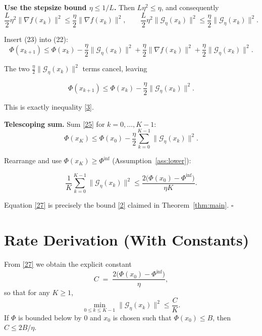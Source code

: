 \documentclass{article}
\begin{document}
\begin{enumerate}[label={[\textbf{Step \arabic*.}]},leftmargin=*,align=left]
\item \textbf{Use the stepsize bound $\eta\le 1/L$.} Then $L\eta^{2}\le\eta$, and consequently
\[
\frac{L}{2}\eta^{2}\|\nabla f(x_k)\|^{2}\le\frac{\eta}{2}\|\nabla f(x_k)\|^{2},
\qquad
\frac{L}{2}\eta^{2}\|\mathcal{G}_{\eta}(x_k)\|^{2}\le\frac{\eta}{2}\|\mathcal{G}_{\eta}(x_k)\|^{2}.
\tag{23}
\]

Insert (23) into (22):
\[
\Phi(x_{k+1})\le \Phi(x_k)-\frac{\eta}{2}\|\mathcal{G}_{\eta}(x_k)\|^{2}
               +\frac{\eta}{2}\|\nabla f(x_k)\|^{2}
               +\frac{\eta}{2}\|\mathcal{G}_{\eta}(x_k)\|^{2}.
\tag{24}
\]

The two $\frac{\eta}{2}\|\mathcal{G}_{\eta}(x_k)\|^{2}$ terms cancel, leaving

\[
\boxed{\Phi(x_{k+1})\le \Phi(x_k)-\frac{\eta}{2}\|\mathcal{G}_{\eta}(x_k)\|^{2}}.
\tag{25}
\]

This is exactly inequality \eqref{3}.

\item \textbf{Telescoping sum.} Sum \eqref{25} for $k=0,\dots,K-1$:
\[
\Phi(x_{K})\le \Phi(x_{0})-\frac{\eta}{2}\sum_{k=0}^{K-1}\|\mathcal{G}_{\eta}(x_k)\|^{2}.
\tag{26}
\]

Rearrange and use $\Phi(x_{K})\ge\Phi^{\inf}$ (Assumption~\ref{ass:lower}):

\[
\frac{1}{K}\sum_{k=0}^{K-1}\|\mathcal{G}_{\eta}(x_k)\|^{2}
\le \frac{2\big(\Phi(x_{0})-\Phi^{\inf}\big)}{\eta K}.
\tag{27}
\]

Equation \eqref{27} is precisely the bound \eqref{2} claimed in Theorem~\ref{thm:main}. \hfill $\square$

\end{enumerate}

\section*{Rate Derivation (With Constants)}
From \eqref{27} we obtain the explicit constant
\[
C\;=\;\frac{2\big(\Phi(x_{0})-\Phi^{\inf}\big)}{\eta},
\]
so that for any $K\ge1$,
\[
\min_{0\le k\le K-1}\|\mathcal{G}_{\eta}(x_k)\|^{2}\le\frac{C}{K}.
\]
If $\Phi$ is bounded below by $0$ and $x_0$ is chosen such that $\Phi(x_0)\le B$, then $C\le 2B/\eta$.
\end{document}
